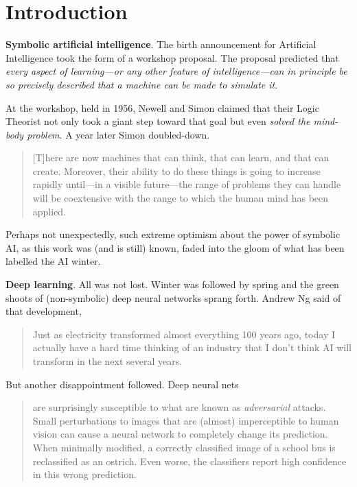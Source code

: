 

\section{Introduction}

\noindent\textbf{Symbolic artificial intelligence}. The birth announcement for Artificial Intelligence took the form of a workshop proposal. The proposal predicted that \textit{every aspect of learning---or any other feature of intelligence---can in principle be so precisely described that a machine can be made to simulate it.}\cite{McCarthy_Minsky_Rochester_Shannon_2006}  

At the workshop, held in 1956, Newell and Simon claimed that their Logic Theorist not only took a giant step toward that goal but even \textit{solved the mind-body problem}.\cite{russell2010artificial} A year later Simon doubled-down.
\begin{quote}
    [T]here are now machines that can think, that can learn, and that can create. Moreover, their ability to do these things is going to increase rapidly until---in a visible future---the range of problems they can handle will be coextensive with the range to which the human mind has been applied.\cite{simon1957models}
\end{quote}

Perhaps not unexpectedly, such extreme optimism about the power of symbolic AI, as this work was (and is still) known, faded into the gloom of what has been labelled the AI winter. 

\smallv\noindent\textbf{Deep learning}. All was not lost. Winter was followed by spring and the green shoots of (non-symbolic) deep neural networks sprang forth. Andrew Ng said of that development, 
\begin{quote}
Just as electricity transformed almost everything 100 years ago, today I actually have a hard time thinking of an industry that I don’t think AI will transform in the next several years.\cite{ng2018ai}
\end{quote}

But another disappointment followed. Deep neural nets 
\begin{quote}
are surprisingly susceptible to what are known as \textit{adversarial} attacks. Small perturbations to images that are (almost) imperceptible to human vision can cause a neural network to completely change its prediction. When minimally modified, a correctly classified image of a school bus is reclassified as an ostrich. Even worse, the classifiers report high confidence in this wrong prediction.\cite{akhtar2018threat}
\end{quote}

